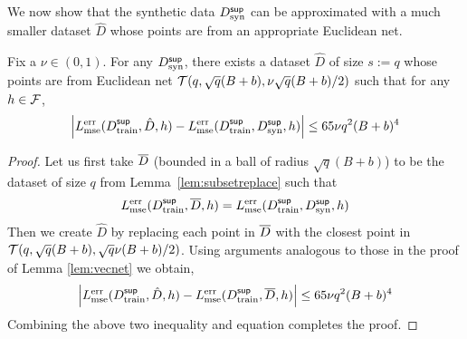 We now show that the synthetic data $ D^{\sf sup}_{\textnormal{syn}}$ can be approximated with a much smaller dataset  $\hat{D}$ whose points are from an appropriate Euclidean net.

\begin{lemma}\label{lem:datasetnet}
    Fix a $\nu \in (0,1)$. For any $D^{\sf sup}_{\textnormal{syn}}$, there exists a dataset $\hat{D}$ of size $s := q$ 
    whose points are from Euclidean net $\mathcal{T}(q, \sqrt{q}(B+b), \nu\sqrt{q}(B+b)/2)$  such that for any $h \in \mathcal{F}$,
    \begin{equation}
        \left|L^{\textnormal{err}}_{\textnormal{mse}}(D^{\sf sup}_{\textnormal{train}}, \hat{D}, h) - L^{\textnormal{err}}_{\textnormal{mse}}(D^{\sf sup}_{\textnormal{train}}, D^{\sf sup}_{\textnormal{syn}}, h)\right| \leq 65\nu q^2(B+b)^4
    \end{equation}
    \end{lemma}
\begin{proof}
    Let us first take $\overline{D}$ (bounded in a ball of radius $\sqrt{q}(B+b)$) to be the dataset of size $q$ from Lemma~\ref{lem:subsetreplace} such that 
    \begin{equation}
        L^{\textnormal{err}}_{\textnormal{mse}}(D^{\sf sup}_{\textnormal{train}}, \overline{D}, h) = L^{\textnormal{err}}_{\textnormal{mse}}(D^{\sf sup}_{\textnormal{train}}, D^{\sf sup}_{\textnormal{syn}}, h)
    \end{equation}
    Then we create $\hat{D}$ by replacing each point in $\overline{D}$ with the closest point in $\mathcal{T}(q, \sqrt{q}(B+b), \sqrt{q}\nu(B+b)/2)$. Using arguments analogous to those in the proof of  Lemma \ref{lem:vecnet} we obtain,
    \begin{equation}
        \left|L^{\textnormal{err}}_{\textnormal{mse}}(D^{\sf sup}_{\textnormal{train}}, \hat{D}, h) - L^{\textnormal{err}}_{\textnormal{mse}}(D^{\sf sup}_{\textnormal{train}}, \overline{D}, h)\right| \leq 65\nu q^2(B+b)^4
    \end{equation}
    Combining the above two inequality and equation completes the proof.
\end{proof}

